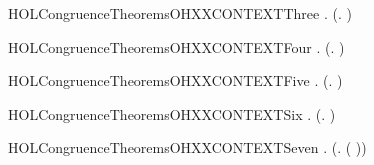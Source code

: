 \begin{SaveVerbatim}{HOLCongruenceTheoremsOHXXCONTEXTThree}
\HOLTokenTurnstile{} \HOLSymConst{\HOLTokenForall{}} .   \HOLSymConst{\HOLTokenImp{}}  (\HOLTokenLambda{}.   \HOLSymConst{+} )
\end{SaveVerbatim}
\newcommand{\HOLCongruenceTheoremsOHXXCONTEXTThree}{\UseVerbatim{HOLCongruenceTheoremsOHXXCONTEXTThree}}
\begin{SaveVerbatim}{HOLCongruenceTheoremsOHXXCONTEXTFour}
\HOLTokenTurnstile{} \HOLSymConst{\HOLTokenForall{}} .   \HOLSymConst{\HOLTokenImp{}}  (\HOLTokenLambda{}.  \HOLSymConst{+}  )
\end{SaveVerbatim}
\newcommand{\HOLCongruenceTheoremsOHXXCONTEXTFour}{\UseVerbatim{HOLCongruenceTheoremsOHXXCONTEXTFour}}
\begin{SaveVerbatim}{HOLCongruenceTheoremsOHXXCONTEXTFive}
\HOLTokenTurnstile{} \HOLSymConst{\HOLTokenForall{}} .   \HOLSymConst{\HOLTokenImp{}}  (\HOLTokenLambda{}.   \HOLSymConst{\ensuremath{\parallel}} )
\end{SaveVerbatim}
\newcommand{\HOLCongruenceTheoremsOHXXCONTEXTFive}{\UseVerbatim{HOLCongruenceTheoremsOHXXCONTEXTFive}}
\begin{SaveVerbatim}{HOLCongruenceTheoremsOHXXCONTEXTSix}
\HOLTokenTurnstile{} \HOLSymConst{\HOLTokenForall{}} .   \HOLSymConst{\HOLTokenImp{}}  (\HOLTokenLambda{}.  \HOLSymConst{\ensuremath{\parallel}}  )
\end{SaveVerbatim}
\newcommand{\HOLCongruenceTheoremsOHXXCONTEXTSix}{\UseVerbatim{HOLCongruenceTheoremsOHXXCONTEXTSix}}
\begin{SaveVerbatim}{HOLCongruenceTheoremsOHXXCONTEXTSeven}
\HOLTokenTurnstile{} \HOLSymConst{\HOLTokenForall{}} .   \HOLSymConst{\HOLTokenImp{}}  (\HOLTokenLambda{}. \HOLConst{\ensuremath{\nu}}  ( ))
\end{SaveVerbatim}
